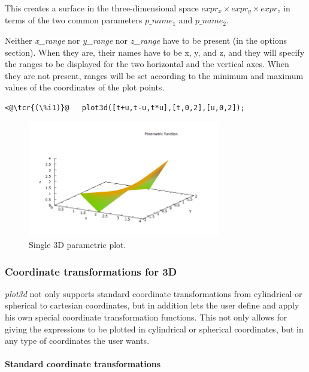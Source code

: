 \documentclass[../Maxima_Workbook.tex]{subfiles}
\begin{document}
\lz This creates a surface in the three-dimensional space $ expr_x \times expr_y \times expr_z $ in terms of the two common parameters \emph{$ p\_name_1 $} and \emph{$ p\_name_2 $}. 

\lz Neither \emph{x\_range} nor \emph{y\_range} nor \emph{z\_range} have to be present (in the options section). When they are, their names have to be x, y, and z, and they will specify the ranges to be displayed for the two horizontal and the vertical axes. When they are not present, ranges will be set according to the minimum and maximum values of the coordinates of the plot points.

\lz \begin{lstlisting}
<@\tcr{(\%i1)}@   plot3d([t+u,t-u,t*u],[t,0,2],[u,0,2]);
\end{lstlisting}
\vspace{-2mm} 

\begin{figure}
	\centering
	\includegraphics[width=0.75\textwidth]{Pl_parametric_plot3d.png}
	\caption{Single 3D parametric plot.}
	\label{Pl-Fig8}
\end{figure}

\subsubsection{Coordinate transformations for 3D}\label{Pl4}

\lz \emph{plot3d} not only supports standard coordinate transformations from cylindrical or spherical to cartesian coordinates, but in addition lets the user define and apply his own special coordinate transformation functions. This not only allows for giving the expressions to be plotted in cylindrical or spherical coordinates, but in any type of coordinates the user wants.

\paragraph{Standard coordinate transformations} \mbox{}
\end{document}
